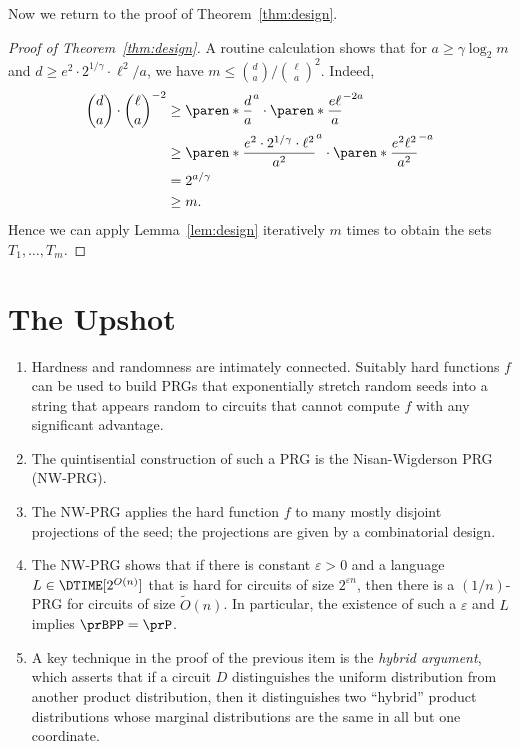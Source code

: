 Now we return to the proof of Theorem~\ref{thm:design}.

\begin{proof}[Proof of Theorem~\ref{thm:design}]
  A routine calculation shows that for $a \ge \gamma \log_2{m}$ and $d \ge e^2
  \cdot 2^{1/\gamma} \cdot \ell^2/a$, we have $m \le \binom{d}{a} /
  \binom{\ell}{a}^2$. Indeed,
  \begin{align*}
    \binom{d}{a} \cdot \binom{\ell}{a}^{-2}
    &\ge \paren*{\frac{d}{a}}^a \cdot \paren*{\frac{e \ell}{a}}^{-2a}\\
    &\ge \paren*{\frac{e^2 \cdot 2^{1/\gamma} \cdot \ell^2}{a^2}}^{a} \cdot \paren*{\frac{e^2 \ell^2}{a^2}}^{-a}\\
    &= 2^{a / \gamma}\\
    &\ge m.
  \end{align*}
  Hence we can apply Lemma~\ref{lem:design} iteratively $m$ times to obtain the
  sets $T_1, \dots, T_m$.
\end{proof}

\section*{The Upshot}

\begin{enumerate}
  \item Hardness and randomness are intimately connected. Suitably hard
    functions $f$ can be used to build PRGs that exponentially stretch random
    seeds into a string that appears random to circuits that cannot compute $f$
    with any significant advantage.
  \item The quintisential construction of such a PRG is the Nisan-Wigderson PRG
    (NW-PRG).
  \item The NW-PRG applies the hard function $f$ to many mostly disjoint
    projections of the seed; the projections are given by a combinatorial
    design.
  \item The NW-PRG shows that if there is constant $\varepsilon > 0$ and a
    language $L \in \DTIME[2^{O(n)}]$ that is hard for circuits of size
    $2^{\varepsilon n}$, then there is a $(1/n)$-PRG for circuits of size
    $\widetilde{O}(n)$. In particular, the existence of such a $\varepsilon$ and
    $L$ implies $\prBPP = \prP$.
  \item A key technique in the proof of the previous item is the \emph{hybrid
    argument}, which asserts that if a circuit $D$ distinguishes the uniform
    distribution from another product distribution, then it distinguishes two
    ``hybrid'' product distributions whose marginal distributions are the same
    in all but one coordinate.
\end{enumerate}
